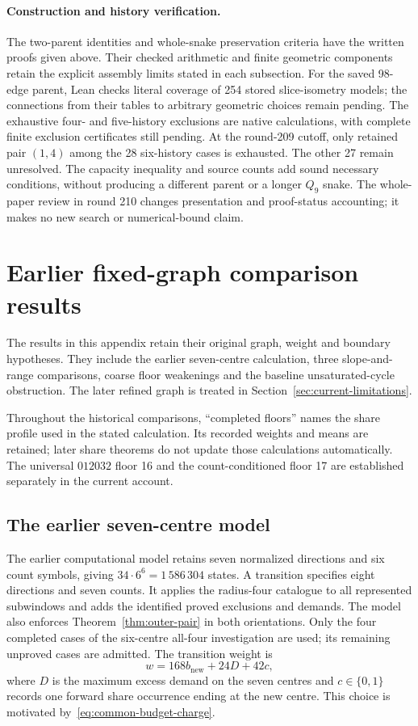 \documentclass[11pt,a4paper]{article}
\theoremstyle{definition}
\theoremstyle{remark}
\begin{document}
\paragraph{Construction and history verification.}
The two-parent identities and whole-snake preservation criteria have the
written proofs given above. Their checked arithmetic and finite geometric
components retain the explicit assembly limits stated in each subsection.
For the saved 98-edge parent, Lean checks literal coverage of 254 stored
slice-isometry models; the connections from their tables to arbitrary
geometric choices remain pending. The exhaustive four- and five-history
exclusions are native calculations, with complete finite exclusion
certificates still pending. At the round-209 cutoff, only retained pair
$(1,4)$ among the 28 six-history cases is exhausted. The other 27 remain
unresolved. The capacity inequality and source counts add sound necessary
conditions, without producing a different parent or a longer $Q_9$ snake.
The whole-paper review in round 210 changes presentation and proof-status
accounting; it makes no new search or numerical-bound claim.

\appendix
\section{Earlier fixed-graph comparison results}\label{app:historical-comparisons}
The results in this appendix retain their original graph, weight and boundary
hypotheses. They include the earlier seven-centre calculation, three
slope-and-range comparisons, coarse floor weakenings and the baseline
unsaturated-cycle obstruction. The later refined graph is treated in
Section~\ref{sec:current-limitations}.

Throughout the historical comparisons, ``completed floors'' names the
share profile used in the stated calculation. Its recorded weights and
means are retained; later share theorems do not update those calculations
automatically. The universal $012032$ floor 16 and the count-conditioned
floor 17 are established separately in the current account.

\subsection{The earlier seven-centre model}
The earlier computational model retains seven normalized directions and six count symbols, giving $34\cdot6^6=1\,586\,304$ states. A transition specifies eight directions and seven counts. It applies the radius-four catalogue to all represented subwindows and adds the identified proved exclusions and demands. The model also enforces Theorem~\ref{thm:outer-pair} in both orientations. Only the four completed cases of the six-centre all-four investigation are used; its remaining unproved cases are admitted. The transition weight is
\[
w=168b_{\mathrm{new}}+24D+42c,
\]
where $D$ is the maximum excess demand on the seven centres and $c\in\{0,1\}$ records one forward share occurrence ending at the new centre. This choice is motivated by~\eqref{eq:common-budget-charge}.
\end{document}
